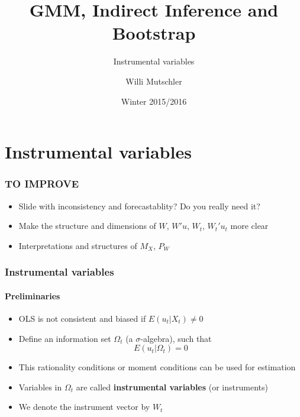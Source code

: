 \documentclass[notes=show]{beamer}
\begin{document}
\title{GMM, Indirect Inference and Bootstrap}
\subtitle{Instrumental variables}
\author[Willi Mutschler]{Willi Mutschler}
\date{Winter 2015/2016}
\maketitle

\section{Instrumental variables}
\begin{frame}\frametitle{TO IMPROVE}
  \begin{itemize}
    \item Slide with inconsistency and forecastablity? Do you really need it?
    \item Make the structure and dimensions of $W$, $W'u$, $W_t$, $W_t'u_t$ more clear
    \item Interpretations and structures of $M_X$, $P_W$
  \end{itemize}
\end{frame}


\begin{frame}\frametitle{Instrumental variables}\framesubtitle{Preliminaries}
\begin{itemize}
    \item OLS is not consistent and biased if $E\left( u_{t}|X_{t}\right) \neq 0$
    \item Define an information set $\Omega _{t}$ (a $\sigma $-algebra), such that
    \begin{equation*}
    E\left( u_{t}|\Omega _{t}\right) =0
    \end{equation*}
    \item This rationality conditions or moment conditions can be used for estimation
    \item Variables in $\Omega _{t}$ are called \textbf{instrumental variables}
    \newline
    (or instruments)
    \item We denote the instrument vector by $W_{t}$
\end{itemize}
\end{frame}
\end{document}
